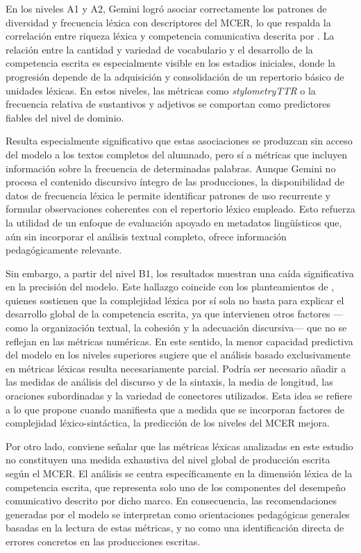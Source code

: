 \documentclass[spanish]{textolivre}
\begin{document}
En los niveles A1 y A2, Gemini logró asociar correctamente los patrones de diversidad y frecuencia léxica con descriptores del MCER, lo que respalda la correlación entre riqueza léxica y competencia comunicativa descrita por \textcite{robles_garcia2019}. La relación entre la cantidad y variedad de vocabulario y el desarrollo de la competencia escrita es especialmente visible en los estadios iniciales, donde la progresión depende de la adquisición y consolidación de un repertorio básico de unidades léxicas. En estos niveles, las métricas como \textit{stylometryTTR} o la frecuencia relativa de sustantivos y adjetivos se comportan como predictores fiables del nivel de dominio.

Resulta especialmente significativo que estas asociaciones se produzcan sin acceso del modelo a los textos completos del alumnado, pero sí a métricas que incluyen información sobre la frecuencia de determinadas palabras. Aunque Gemini no procesa el contenido discursivo íntegro de las producciones, la disponibilidad de datos de frecuencia léxica le permite identificar patrones de uso recurrente y formular observaciones coherentes con el repertorio léxico empleado. Esto refuerza la utilidad de un enfoque de evaluación apoyado en metadatos lingüísticos que, aún sin incorporar el análisis textual completo, ofrece información pedagógicamente relevante.

Sin embargo, a partir del nivel B1, los resultados muestran una caída significativa en la precisión del modelo. Este hallazgo coincide con los planteamientos de \textcite{cuberos_vicente2019,consolini_kyle2024}, quienes sostienen que la complejidad léxica por sí sola no basta para explicar el desarrollo global de la competencia escrita, ya que intervienen otros factores —como la organización textual, la cohesión y la adecuación discursiva— que no se reflejan en las métricas numéricas. En este sentido, la menor capacidad predictiva del modelo en los niveles superiores sugiere que el análisis basado exclusivamente en métricas léxicas resulta necesariamente parcial. Podría ser necesario añadir a las medidas de análisis del discurso y de la sintaxis, la media de longitud, las oraciones subordinadas y la variedad de conectores utilizados. Esta idea se refiere a lo que propone \textcite{hu2021} cuando manifiesta que a medida que se incorporan factores de complejidad léxico-sintáctica, la predicción de los niveles del MCER mejora.

Por otro lado, conviene señalar que las métricas léxicas analizadas en este estudio no constituyen una medida exhaustiva del nivel global de producción escrita según el MCER. El análisis se centra específicamente en la dimensión léxica de la competencia escrita, que representa solo uno de los componentes del desempeño comunicativo descrito por dicho marco. En consecuencia, las recomendaciones generadas por el modelo se interpretan como orientaciones pedagógicas generales basadas en la lectura de estas métricas, y no como una identificación directa de errores concretos en las producciones escritas.
\end{document}
